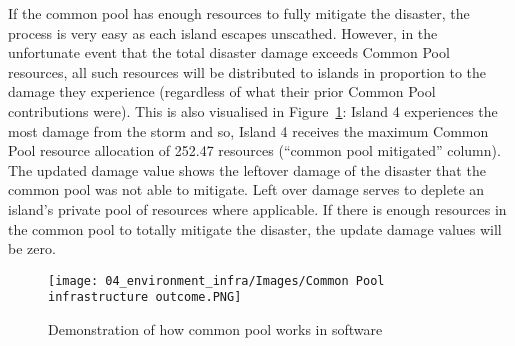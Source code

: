 If the common pool has enough resources to fully mitigate the disaster, the process is very easy as each island escapes unscathed. However, in the unfortunate event that the total disaster damage exceeds Common Pool resources, all such resources will be distributed to islands in proportion to the damage they experience (regardless of what their prior Common Pool contributions were). This is also visualised in Figure~\ref{fig:Common Pool infrastructure outcome}: Island 4 experiences the most damage from the storm and so, Island 4 receives the maximum Common Pool resource allocation of 252.47 resources (“common pool mitigated” column). The updated damage value shows the leftover damage of the disaster that the common pool was not able to mitigate. Left over damage serves to deplete an island's private pool of resources where applicable. If there is enough resources in the common pool to totally mitigate the disaster, the update damage values will be zero.

\begin{figure}[!htb]
    \centering
    \texttt{[image: 04\_environment\_infra/Images/Common Pool infrastructure outcome.PNG]}
    \caption{Demonstration of how common pool works in software}
    \label{fig:Common Pool infrastructure outcome}
\end{figure}

